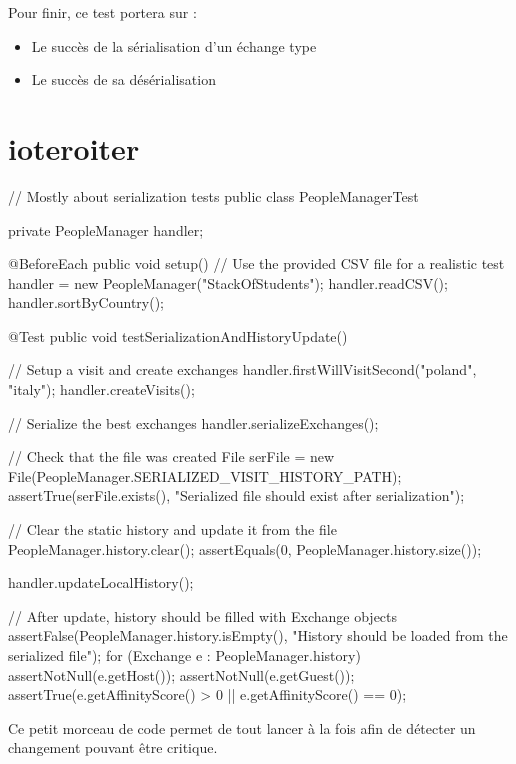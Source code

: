 \documentclass{mytex}
\begin{document}

Pour finir, ce test portera sur :

\begin{itemize}
	\item Le succès de la sérialisation d'un échange type
	\item Le succès de sa désérialisation
\end{itemize}


\section{ioteroiter}


\begin{codebox}
// Mostly about serialization tests
public class PeopleManagerTest {
	
	private PeopleManager handler;
	
	@BeforeEach
	public void setup() {
		// Use the provided CSV file for a realistic test
		handler = new PeopleManager("StackOfStudents");
		handler.readCSV();
		handler.sortByCountry();
	}
	
	@Test
	public void testSerializationAndHistoryUpdate() {
		// Setup a visit and create exchanges
		handler.firstWillVisitSecond("poland", "italy");
		handler.createVisits();
		
		// Serialize the best exchanges
		handler.serializeExchanges();
		
		// Check that the file was created
		File serFile = new File(PeopleManager.SERIALIZED_VISIT_HISTORY_PATH);
		assertTrue(serFile.exists(), "Serialized file should exist after serialization");
		
		// Clear the static history and update it from the file
		PeopleManager.history.clear();
		assertEquals(0, PeopleManager.history.size());
		
		handler.updateLocalHistory();
		
		// After update, history should be filled with Exchange objects
		assertFalse(PeopleManager.history.isEmpty(), "History should be loaded from the serialized file");
		for (Exchange e : PeopleManager.history) {
			assertNotNull(e.getHost());
			assertNotNull(e.getGuest());
			assertTrue(e.getAffinityScore() > 0 || e.getAffinityScore() == 0);
		}
	}
}
\end{codebox}


Ce petit morceau de code permet de tout lancer à la fois afin de détecter un changement pouvant être critique.
\end{document}
